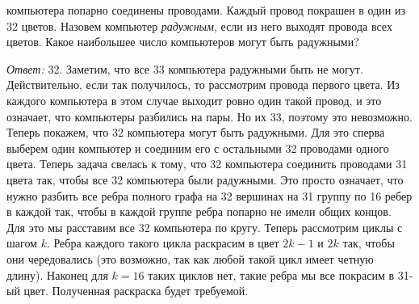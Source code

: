  компьютера попарно соединены проводами.
Каждый провод покрашен в один из 32 цветов.
Назовем компьютер \emph{радужным}, если из него выходят провода всех цветов.
Какое наибольшее число компьютеров могут быть радужными?

\solution
\emph{Ответ:} 32.
Заметим, что все 33 компьютера радужными быть не могут.
Действительно, если так получилось, то рассмотрим провода первого цвета.
Из каждого компьютера в этом случае выходит ровно один такой провод, и это
означает, что компьютеры разбились на пары.
Но их 33, поэтому это невозможно.
Теперь покажем, что 32 компьютера могут быть радужными.
Для это сперва выберем один компьютер и соединим его с остальными 32 проводами
одного цвета.
Теперь задача свелась к тому, что 32 компьютера соединить проводами 31 цвета
так, чтобы все 32 компьютера были радужными.
Это просто означает, что нужно разбить все ребра полного графа на 32 вершинах
на 31 группу по 16 ребер в каждой так, чтобы в каждой группе ребра попарно не
имели общих концов.
Для это мы расставим все 32 компьютера по кругу.
Теперь рассмотрим циклы с шагом $k$.
Ребра каждого такого цикла раскрасим в цвет $2 k - 1$ и $2 k$ так, чтобы они
чередовались (это возможно, так как любой такой цикл имеет четную длину).
Наконец для $k = 16$ таких циклов нет, такие ребра мы все покрасим в 31-ый
цвет.
Полученная раскраска будет требуемой.
\endproblem
